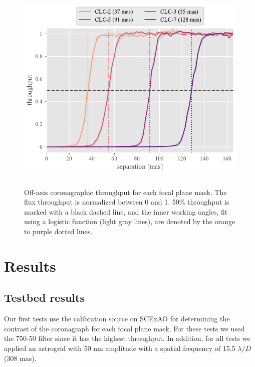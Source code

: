 \documentclass[]{spie}  %
\begin{document}
\begin{figure}
   \centering
   \includegraphics[height=4in]{figures/throughput_curves}
   \caption{Off-axis coronagraphic throughput for each focal plane mask. The flux throughput is normalized between 0 and 1. 50\% throughput is marked with a black dashed line, and the inner working angles, fit using a logistic function (light gray lines), are denoted by the orange to purple dotted lines.}\label{fig:throughput}
\end{figure}

\section{Results}\label{sec:results}

\subsection{Testbed results}\label{sec:testbed}

Our first tests use the calibration source on SCExAO for determining the contrast of the coronagraph for each focal plane mask. For these tests we used the 750-50 filter since it has the highest throughput. In addition, for all tests we applied an astrogrid with 50 nm amplitude with a spatial frequency of 15.5 $\lambda/D$ (308 mas).
\end{document}
